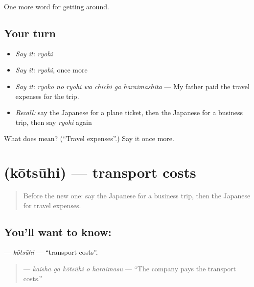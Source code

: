 \begin{grammarlens}[title={What you've built}]
One more word for getting around.
\end{grammarlens}

\subsection*{Your turn}
\begin{itemize}
\raggedright
  \item \emph{Say it:} \emph{ryohi}
  \item \emph{Say it:} \emph{ryohi}, once more
  \item \emph{Say it:} \emph{ryokō no ryohi wa chichi ga haraimashita} — My father paid the travel expenses for the trip.
  \item \emph{Recall:} say the Japanese for a plane ticket, then the Japanese for a business trip, then say \emph{ryohi} again
\end{itemize}

\begin{tcolorbox}[breakable,colback=teal!4,colframe=teal!35!black,title={Before you move on}]
What does  mean? (\textquotedblleft{}Travel expenses\textquotedblright{}.) Say it once more.
\end{tcolorbox}
\section[\texorpdfstring{\ja{こうつうひ} (kōtsūhi)}{こうつうひ (kōtsūhi)}]{ (kōtsūhi) — transport costs}

\label{lesson:JA-C388-koutsuuhi}



\begin{quote}
Before the new one: say the Japanese for a business trip, then the Japanese for travel expenses.
\end{quote}

\subsection*{You'll want to know: }
\textbf{} — \emph{kōtsūhi} — \textquotedblleft{}transport costs\textquotedblright{}.

\begin{quote}
\textbf{  } — \emph{kaisha ga kōtsūhi o haraimasu} — \textquotedblleft{}The company pays the transport costs.\textquotedblright{}
\end{quote}

